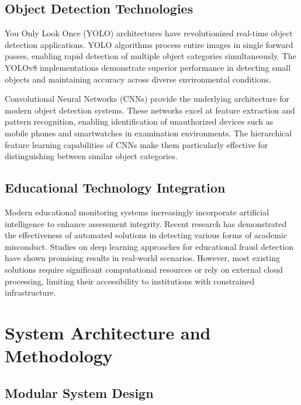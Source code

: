 \documentclass[conference]{IEEEtran}
\begin{document}
\subsection{Object Detection Technologies}

You Only Look Once (YOLO) architectures have revolutionized real-time object detection 
applications. YOLO algorithms process entire images in single forward passes, enabling 
rapid detection of multiple object categories simultaneously\cite{wang2022object}. The 
YOLOv8 implementations demonstrate superior performance in detecting small objects 
and maintaining accuracy across diverse environmental conditions\cite{v7labs2023yolo}.

Convolutional Neural Networks (CNNs) provide the underlying architecture for modern object 
detection systems\cite{goodfellow2016deep}. These networks excel at feature extraction 
and pattern recognition, enabling identification of unauthorized devices such as mobile 
phones and smartwatches in examination environments. The hierarchical feature learning 
capabilities of CNNs make them particularly effective for distinguishing between similar 
object categories\cite{paszke2019pytorch}.

\subsection{Educational Technology Integration}

Modern educational monitoring systems increasingly incorporate artificial intelligence 
to enhance assessment integrity\cite{russell2020artificial}. Recent research has demonstrated 
the effectiveness of automated solutions in detecting various forms of academic 
misconduct\cite{honorlock2023detecting}. Studies on deep learning approaches for educational 
fraud detection have shown promising results in real-world scenarios\cite{chen2023deep}. However, most existing solutions require significant 
computational resources or rely on external cloud processing, limiting their accessibility 
to institutions with constrained infrastructure.

\section{System Architecture and Methodology}

\subsection{Modular System Design}
\end{document}
